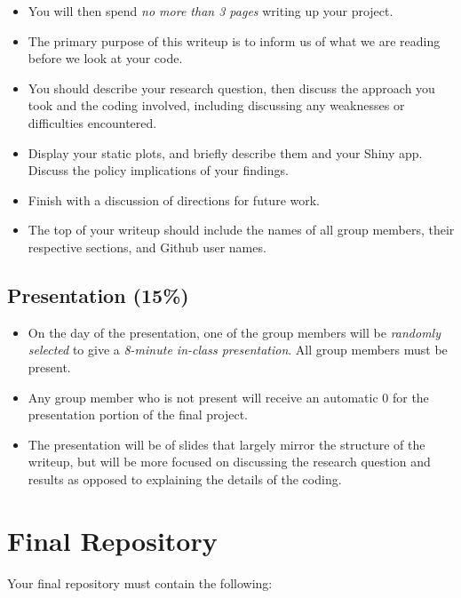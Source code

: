 \documentclass[
  letterpaper,
  DIV=11,
  numbers=noendperiod]{scrartcl}
\providecommand{\tightlist}{%
  \setlength{\itemsep}{0pt}\setlength{\parskip}{0pt}}\usepackage{longtable,booktabs,array}
\begin{document}
\begin{itemize}
\tightlist
\item
  You will then spend \emph{no more than 3 pages} writing up your
  project.
\item
  The primary purpose of this writeup is to inform us of what we are
  reading before we look at your code.
\item
  You should describe your research question, then discuss the approach
  you took and the coding involved, including discussing any weaknesses
  or difficulties encountered.
\item
  Display your static plots, and briefly describe them and your Shiny
  app. Discuss the policy implications of your findings.
\item
  Finish with a discussion of directions for future work.
\item
  The top of your writeup should include the names of all group members,
  their respective sections, and Github user names.
\end{itemize}

\subsection{Presentation (15\%)}\label{presentation-15}

\begin{itemize}
\tightlist
\item
  On the day of the presentation, one of the group members will be
  \emph{randomly selected} to give a \emph{8-minute in-class
  presentation}. All group members must be present.
\item
  Any group member who is not present will receive an automatic 0 for
  the presentation portion of the final project.
\item
  The presentation will be of slides that largely mirror the structure
  of the writeup, but will be more focused on discussing the research
  question and results as opposed to explaining the details of the
  coding.
\end{itemize}

\section{Final Repository}\label{final-repository}

Your final repository must contain the following:
\end{document}
